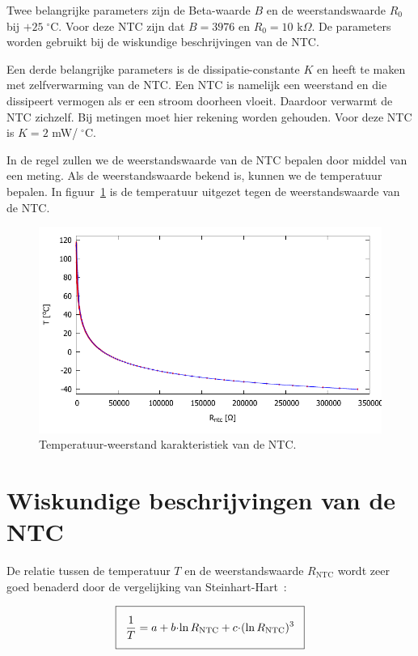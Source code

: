 \documentclass[12pt,a4paper,final,twoside,fleqn]{article}
\newcommand{\mathcelc}[1]{\mbox{$#1\;^\circ\text{C}$}}
\newcommand{\rntc}{R_\text{NTC}}
\let\oldcdot\cdot
\renewcommand{\cdot}{\kern-.10em\oldcdot\kern-.10em}
\begin{document}
Twee belangrijke parameters zijn de Beta-waarde $B$ en de weerstandswaarde $R_0$ bij
\mathcelc{+25}. Voor deze NTC zijn dat $B=3976$ en $R_0=10\text{ k}\Omega$. De
parameters worden gebruikt bij de wiskundige beschrijvingen van de NTC.

Een derde belangrijke parameters is de dissipatie-constante $K$ en heeft te
maken met zelfverwarming van de NTC. Een NTC is namelijk een weerstand en die
dissipeert vermogen als er een stroom doorheen vloeit. Daardoor verwarmt de
NTC zichzelf. Bij metingen moet hier rekening worden gehouden. Voor deze NTC
is $K=2$ mW/\mathcelc{\!}.

In de regel zullen we de weerstandswaarde van de NTC bepalen door middel van
een meting. Als de weerstandswaarde bekend is, kunnen we de temperatuur bepalen.
In figuur~\ref{fig:ntc_ntc_plot_celsius_fig_inv} is de temperatuur uitgezet tegen
de weerstandswaarde van de NTC.

\begin{figure}[ht!]
\centering
\includegraphics[scale=1]{gnuplot/ntc_ntc_plot_celsius_fig_inv}
\caption{Temperatuur-weerstand karakteristiek van de NTC.}
\label{fig:ntc_ntc_plot_celsius_fig_inv}
\end{figure}


\clearpage
\section{Wiskundige beschrijvingen van de NTC}

De relatie tussen de temperatuur $T$ en de weerstandswaarde $\rntc$ wordt zeer
goed benaderd door de vergelijking van Steinhart-Hart~\cite{STEINHART1968497}:

\begin{equation}
\label{equ:steinharthart}
\setlength\fboxsep{2ex}
\boxed{\dfrac{1}{T} = a + b\cdot\ln \rntc + c\cdot( \ln \rntc )^3}
\end{equation}
\end{document}
